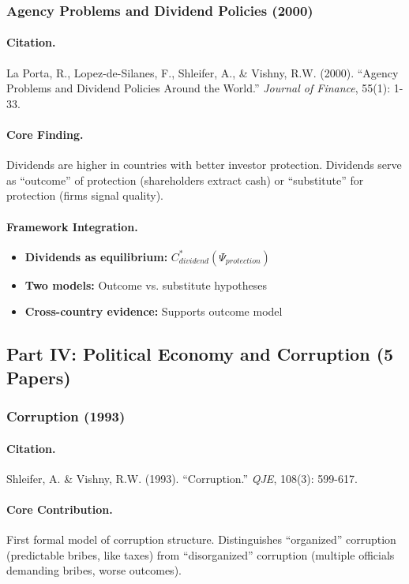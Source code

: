 \documentclass[12pt,a4paper]{article}
\begin{document}
\subsubsection{Agency Problems and Dividend Policies (2000)}

\paragraph{Citation.}
La Porta, R., Lopez-de-Silanes, F., Shleifer, A., \& Vishny, R.W. (2000).
``Agency Problems and Dividend Policies Around the World.''
\emph{Journal of Finance}, 55(1): 1-33.

\paragraph{Core Finding.}
Dividends are higher in countries with better investor protection.
Dividends serve as ``outcome'' of protection (shareholders extract cash)
or ``substitute'' for protection (firms signal quality).

\paragraph{Framework Integration.}
\begin{itemize}
  \item \textbf{Dividends as equilibrium:} $C^*_{dividend}(\Psi_{protection})$
  \item \textbf{Two models:} Outcome vs. substitute hypotheses
  \item \textbf{Cross-country evidence:} Supports outcome model
\end{itemize}

\subsection{Part IV: Political Economy and Corruption (5 Papers)}

\subsubsection{Corruption (1993)}

\paragraph{Citation.}
Shleifer, A. \& Vishny, R.W. (1993).
``Corruption.'' \emph{QJE}, 108(3): 599-617.

\paragraph{Core Contribution.}
First formal model of corruption structure. Distinguishes ``organized''
corruption (predictable bribes, like taxes) from ``disorganized'' corruption
(multiple officials demanding bribes, worse outcomes).
\end{document}
